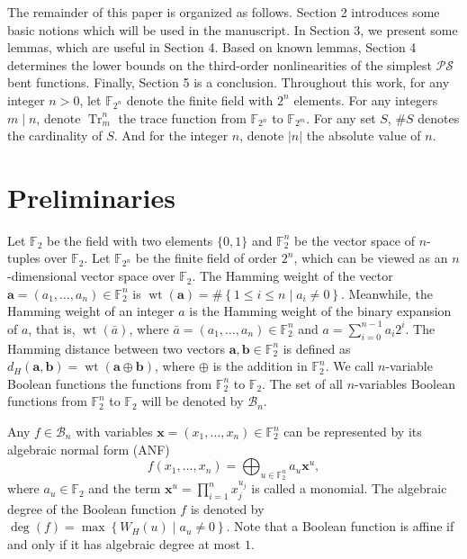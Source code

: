 \documentclass{article}
\newcommand{\F}{\mathbb{F}}
\newcommand{\0}{\textbf{0}}
\newcommand{\1}{\textbf{1}}
\newcommand{\wt}{\operatorname{wt}}
\theoremstyle{plain}
\begin{document}
    The remainder of this paper is organized as follows.  
    Section 2 introduces some basic notions which will be used in the manuscript. 
    In Section 3, we present some lemmas, which are useful in Section 4.  
    Based on known lemmas, Section 4 determines the lower bounds on the third-order nonlinearities of the simplest $ \mathcal{PS} $ bent functions. 
    Finally, Section 5 is a conclusion. 
    Throughout this work, for any integer $ n>0 $, let $ \F_{2^n} $ denote the finite field with $ 2^n $ elements. For any integers $ m\mid n $, denote $ \operatorname{Tr}_m^n $ the trace function from $ \F_{2^n} $ to $ \F_{2^m} $. For any set $ S $, $ \#S $ denotes the cardinality of $ S $. And for the integer $ n $, denote $ |n| $ the absolute value of $ n $. 

\section{Preliminaries}

    Let $ \F_2 $ be the field with two elements $ \{0,1\} $ and $ \F_2^n $ be the vector space of $ n $-tuples over $ \F_2 $. 
    Let $ \F_{2^n} $ be the finite field of order $ 2^n $, which can be viewed as an $ n $-dimensional vector space over $ \F_2 $.
    The Hamming weight of the vector $ \bm{a}=(a_1,\dots,a_n)\in\F_2^n $ is $ \wt(\bm{a})=\#\left\{ 1\le i\le n\mid a_i\ne 0 \right\} $. Meanwhile, the Hamming weight of an integer $ a $ is the Hamming weight of the binary expansion of $ a $, that is, $ \wt(\bar{a}) $, where $ \bar{a}=(a_1,\dots,a_n)\in\F_2^n $ and $ a=\sum_{i=0}^{n-1}a_i2^i $. 
    The Hamming distance between two vectors $ \bm{a},\bm{b}\in\F_2^n $ is defined as $ d_H(\bm{a},\bm{b})=\wt(\bm{a}\oplus\bm{b}) $, where $ \oplus $ is the addition in $ \F_2^n $.  
    We call $ n $-variable Boolean functions the functions from $ \F_2^n $ to $ \F_2 $. 
    The set of all $ n $-variables Boolean functions from $ \F_2^n $ to $ \F_2 $ will be denoted by $ \mathcal{B}_n $. 

    Any $ f\in\mathcal{B}_n $ with variables $ \bm{x}=(x_1,\dots,x_n)\in\F_2^n $ can be  represented by its algebraic normal form (ANF)
    \[f(x_1,\dots,x_n) = \bigoplus_{u\in\F_2^n}a_{u}\bm{x}^{u},\]
    where $ a_u\in\F_2 $ and the term $ \bm{x}^{u}=\prod_{i=1}^nx_j^{u_j} $ is called a monomial.
    The algebraic degree of the Boolean function $ f $ is denoted by $ \deg(f)=\max\left\{ W_H(u)\mid a_u\ne 0 \right\} $. 
    Note that a Boolean function is affine if and only if it has algebraic degree at most $ 1 $. 
    
\end{document}
